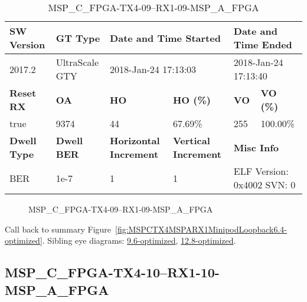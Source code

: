 \begin{table}[h]
\centering
\caption{MSP\_C\_FPGA-TX4-09--RX1-09-MSP\_A\_FPGA}
\label{tab:MSPCFPGATX409RX109MSPAFPGA6.4-optimized}
\begin{tabular}{@{}|l|l|l|l|l|l|@{}}
\toprule
\textbf{SW Version}                & \textbf{GT Type}   & \multicolumn{2}{l|}{\textbf{Date and Time Started}}            & \multicolumn{2}{l|}{\textbf{Date and Time Ended}}        \\ \midrule
2017.2                       & UltraScale GTY          & \multicolumn{2}{l|}{2018-Jan-24 17:13:03}                   & \multicolumn{2}{l|}{2018-Jan-24 17:13:40}               \\ \midrule
\textbf{Reset RX}                  & \textbf{OA} & \textbf{HO}   & \textbf{HO (\%)} & \textbf{VO} & \textbf{VO (\%)} \\ \midrule
true & 9374        & 44          & 67.69\%        & 255        & 100.00\%       \\ \midrule
\textbf{Dwell Type}                & \textbf{Dwell BER} & \textbf{Horizontal Increment} & \textbf{Vertical Increment}    & \multicolumn{2}{l|}{\textbf{Misc Info}}                  \\ \midrule
BER                            & 1e-7        & 1        & 1           & \multicolumn{2}{l|}{ELF Version: 0x4002 SVN: 0}                         \\ \bottomrule
\end{tabular}
\end{table}

\begin{figure}[h]
\caption{MSP\_C\_FPGA-TX4-09--RX1-09-MSP\_A\_FPGA} \label{fig:MSPCFPGATX409RX109MSPAFPGA6.4-optimized}
\end{figure}

Call back to summary Figure~\ref{fig:MSPCTX4MSPARX1MinipodLoopback6.4-optimized}.
Sibling eye diagrams: \hyperref[sec:MSPCFPGATX409RX109MSPAFPGA9.6-optimized]{9.6-optimized}, \hyperref[sec:MSPCFPGATX409RX109MSPAFPGA12.8-optimized]{12.8-optimized}.

\clearpage
\newpage


\subsection{MSP\_C\_FPGA-TX4-10--RX1-10-MSP\_A\_FPGA}\label{sec:MSPCFPGATX410RX110MSPAFPGA6.4-optimized}

